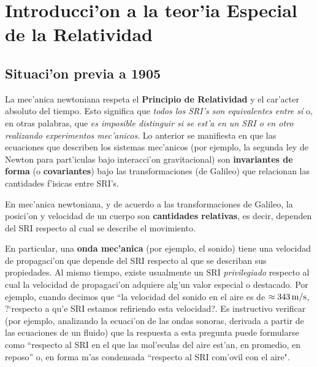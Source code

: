 \chapter{Introducci'on a la teor'ia Especial de la Relatividad}

\section{Situaci'on previa a 1905}

La mec'anica newtoniana respeta el \textbf{Principio de Relatividad} y el car'acter absoluto del tiempo. Esto significa que \textit{todos los SRI's son equivalentes entre s\'i} o, en otras palabras, que \textit{es imposible distinguir si se est'a en un SRI o en otro realizando experimentos mec'anicos}.
Lo anterior se manifiesta en que las ecuaciones que describen los sistemas mec'anicos (por ejemplo, la segunda ley de Newton para part'iculas bajo interacci'on gravitacional) son \textbf{invariantes de forma} (o \textbf{covariantes}) bajo las transformaciones (de Galileo) que relacionan las cantidades f'isicas entre SRI's.

En mec'anica newtoniana, y de acuerdo a las transformaciones de Galileo, la
posici'on y velocidad de un cuerpo  son \textbf{cantidades relativas}, es decir, dependen del SRI respecto al cual se describe el movimiento.

En particular, una \textbf{onda mec'anica} (por ejemplo, el sonido) tiene una velocidad de propagaci'on que depende del SRI respecto al que se describan sus propiedades. Al mismo tiempo, existe usualmente un SRI \textit{privilegiado} respecto al cual la velocidad de propagaci'on adquiere alg'un valor especial o destacado.
Por ejemplo, cuando decimos que ``la velocidad del sonido en el aire es de $\approx 343\,\rm m/s$, ?`respecto a qu'e SRI estamos refiriendo esta velocidad?. Es instructivo verificar (por ejemplo, analizando la ecuaci'on de las ondas sonoras, derivada a partir de las ecuaciones de un fluido) que la respuesta a esta pregunta puede formularse como ``respecto al SRI en el que las mol'eculas del aire est'an, en promedio, en reposo'' o, en forma m'as condensada ``respecto al SRI com'ovil con el aire".

